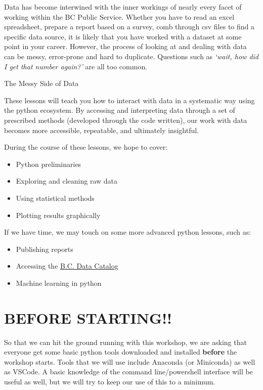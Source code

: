 \documentclass[
  letterpaper,
  DIV=11,
  numbers=noendperiod]{scrreprt}
\providecommand{\tightlist}{%
  \setlength{\itemsep}{0pt}\setlength{\parskip}{0pt}}\usepackage{longtable,booktabs,array}
\begin{document}
Data has become interwined with the inner workings of nearly every facet
of working within the BC Public Service. Whether you have to read an
excel spreadsheet, prepare a report based on a survey, comb through csv
files to find a specific data source, it is likely that you have worked
with a dataset at some point in your career. However, the process of
looking at and dealing with data can be messy, error-prone and hard to
duplicate. Questions such as \emph{`wait, how did I get that number
again?'} are all too common.

The Messy Side of Data

These lessons will teach you how to interact with data in a systematic
way using the python ecosystem. By accessing and interpreting data
through a set of prescribed methods (developed through the code
written), our work with data becomes more accessible, repeatable, and
ultimately insightful.

During the course of these lessons, we hope to cover:

\begin{itemize}
\tightlist
\item
  Python preliminaries
\item
  Exploring and cleaning raw data
\item
  Using statistical methods
\item
  Plotting results graphically
\end{itemize}

If we have time, we may touch on some more advanced python lessons, such
as:

\begin{itemize}
\tightlist
\item
  Publishing reports
\item
  Accessing the \href{https://catalogue.data.gov.bc.ca/}{B.C. Data
  Catalog}
\item
  Machine learning in python
\end{itemize}

\hypertarget{before-starting}{%
\section{BEFORE STARTING!!}\label{before-starting}}

So that we can hit the ground running with this workshop, we are asking
that everyone get some basic python tools downloaded and installed
\textbf{before} the workshop starts. Tools that we will use include
Anaconda (or Miniconda) as well as VSCode. A basic knowledge of the
command line/powershell interface will be useful as well, but we will
try to keep our use of this to a minimum.
\end{document}
